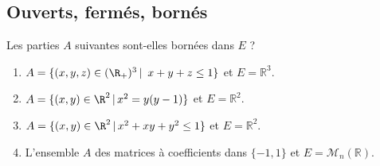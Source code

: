 \documentclass[a4paper,twoside,french,11pt]{VcCours}
\begin{document}
\subsection{Ouverts, fermés, bornés}




\begin{Exercice}{} Les parties $A$ suivantes sont-elles bornées dans $E$ ?

\begin{enumerate}
\item $A= \lbrace (x,y,z)\in (\R_+)^3 \, \vert \,  \ x+y+z\leq 1\rbrace$ et $E= \mathbb{R}^3$.
\item $A = \lbrace (x,y)\in\R^2 \, \vert \, x^2=y(y-1) \rbrace$ et $E= \mathbb{R}^2$.
\item $A = \lbrace (x,y)\in\R^2 \, \vert \, x^2+xy+y^2\leq1 \rbrace$ et $E= \mathbb{R}^2$.
\item L'ensemble $A$ des matrices à coefficients dans $\lbrace -1,1 \rbrace$ et $E = \mathcal{M}_n(\mathbb{R})$.
\end{enumerate}
\end{Exercice}
\end{document}
